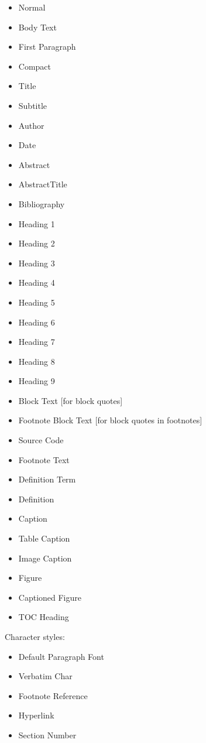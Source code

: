 \documentclass[
]{article}
\providecommand{\tightlist}{%
  \setlength{\itemsep}{0pt}\setlength{\parskip}{0pt}}
\begin{document}
\begin{description}
\begin{description}
\begin{itemize}
\tightlist
\item
  Normal
\item
  Body Text
\item
  First Paragraph
\item
  Compact
\item
  Title
\item
  Subtitle
\item
  Author
\item
  Date
\item
  Abstract
\item
  AbstractTitle
\item
  Bibliography
\item
  Heading 1
\item
  Heading 2
\item
  Heading 3
\item
  Heading 4
\item
  Heading 5
\item
  Heading 6
\item
  Heading 7
\item
  Heading 8
\item
  Heading 9
\item
  Block Text {[}for block quotes{]}
\item
  Footnote Block Text {[}for block quotes in footnotes{]}
\item
  Source Code
\item
  Footnote Text
\item
  Definition Term
\item
  Definition
\item
  Caption
\item
  Table Caption
\item
  Image Caption
\item
  Figure
\item
  Captioned Figure
\item
  TOC Heading
\end{itemize}

Character styles:

\begin{itemize}
\tightlist
\item
  Default Paragraph Font
\item
  Verbatim Char
\item
  Footnote Reference
\item
  Hyperlink
\item
  Section Number
\end{itemize}


\end{description}
\end{description}
\end{document}
